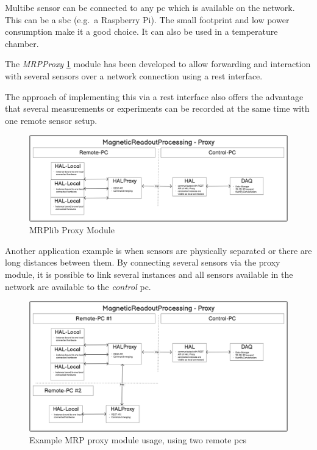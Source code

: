 Multibe sensor can be connected to any \gls{pc} which is available on
the network. This can be a \gls{sbc} (e.g.~a Raspberry Pi). The small
footprint and low power consumption make it a good choice. It can also
be used in a temperature chamber.

The \emph{MRPProxy} \ref{MRPlib_Proxy_Module.png} module has been
developed to allow forwarding and interaction with several sensors over
a network connection using a \gls{rest} interface.

The approach of implementing this via a \gls{rest} interface also offers
the advantage that several measurements or experiments can be recorded
at the same time with one remote sensor setup.

\begin{figure}
\centering
\includegraphics{./generated_images/border_MRPlib_Proxy_Module.png}
\caption{MRPlib Proxy Module \label{MRPlib_Proxy_Module.png}}
\end{figure}

Another application example is when sensors are physically separated or
there are long distances between them. By connecting several sensors via
the proxy module, it is possible to link several instances and all
sensors available in the network are available to the \emph{control}
\gls{pc}.

\begin{figure}
\centering
\includegraphics{./generated_images/border_Example_MRP_proxy_module_usage,_using_two_remote_(+pc)s.png}
\caption{Example MRP proxy module usage, using two remote \gls{pc}s
\label{Example_MRP_proxy_module_usage,_using_two_remote_(+pc)s.png}}
\end{figure}

